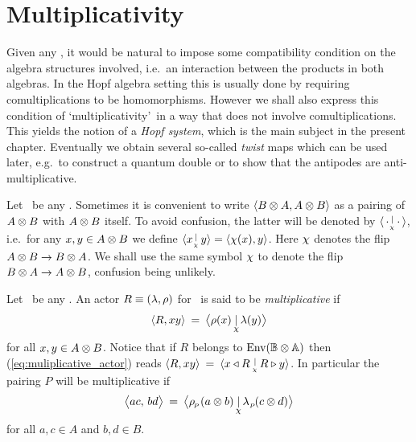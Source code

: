 \section{Multiplicativity}
\label{par:multiplicativity}


\begin{abs_chp}
Given any \dpa, it would be natural to impose some compatibility condition
on the algebra structures involved, i.e.\ an interaction between the
products in both algebras.
In the Hopf algebra setting this is usually done by requiring comultiplications
to be homomorphisms.
However we shall also express this condition of \lq multiplicativity\rq\ in a
way that does not involve comultiplications.
This yields the notion of a {\em Hopf system}, which is the main subject
in the present chapter.
Eventually we obtain several so-called {\em twist\/} maps which can be used later,
e.g.\ to construct a quantum double or to show that the antipodes are
anti-multiplicative.
\end{abs_chp}



Let \pairAB\ be any \idpa\@.
Sometimes it is convenient to write $\langle B \otimes A,A \otimes B \rangle$
as a pairing of $A \otimes B$ with $A \otimes B$ itself.
To avoid confusion, the latter will be denoted by
$ \langle \,\cdot \, ^{_{\scriptstyle \mid}}_{_{\!\chi\,}} \cdot\, \rangle$, i.e.\ for any $x,y \in A \otimes B$
we define $ \langle x \, ^{_{\scriptstyle \mid}}_{_{\!\chi\,}} y \rangle = \langle \chi(x),y \rangle$.
Here $\chi$ denotes the flip $A \otimes B \rightarrow B \otimes A$.
We shall use the same symbol $\chi$ to denote the flip $B \otimes A \rightarrow A \otimes B$,
confusion being unlikely.



\begin{defn_sec}   \label{def:muliplicative_actor}
Let \pairAB\ be any \idpa\@.
An actor $R\equiv(\lambda,\rho)$ for \BBAA\ is said to be {\em multiplicative\/} if
\begin{equation}\label{eq:muliplicative_actor}
\pair{R}{xy}  \:=\: \pairflipM{\rho(x)}{\lam(y)}
\end{equation}
for all $x,y \in A \otimes B$. Notice that if $R$ belongs to $\mbox{\rm Env}(\mathbb{B} \otimes \mathbb{A})$ then
(\ref{eq:muliplicative_actor}) reads
$\langle R,xy \rangle \:=\:  \langle x \triangleleft R\, \, ^{_{\scriptstyle \mid}}_{_{\!\chi\,}} R \triangleright y \rangle$.
In particular the pairing $P$ will be multiplicative if
\begin{equation} \label{eq:muliplicative_pairing}
  \pairM{ac}{bd} \:=\: \pairflipM{\rp(a \tens b)}{\lp(c\tens d)}
\end{equation}
for all $a,c\in A$ and $b,d\in B$.
\end{defn_sec}



